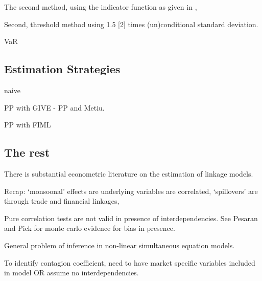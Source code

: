 \documentclass[../base.tex]{subfiles}
\begin{document}
The second method, using the indicator function as given in \cite{pesaran2007econometric}, 

 Second, threshold method using 1.5 [2] times (un)conditional standard deviation. 


\cite{metiu2012sovereign} VaR



\subsection{Estimation Strategies}

naive

PP with GIVE - PP and Metiu.

 
PP with FIML
\cite{massacci2007identification}









\subsection{The rest}






There is substantial econometric literature on the estimation of linkage models. 

Recap: `monsoonal' effects are underlying variables are correlated, `spillovers' are through trade and financial linkages, 

Pure correlation tests are not valid in presence of interdependencies. See Pesaran and Pick for monte carlo evidence for bias in presence. 

General problem of inference in non-linear simultaneous equation models. 

To identify contagion coefficient, need to have market specific variables included in model OR assume no interdependencies.
\end{document}
